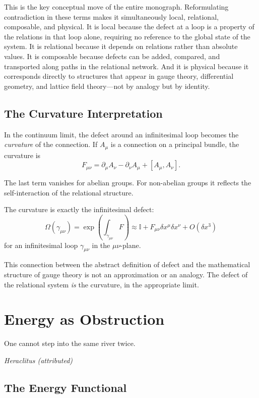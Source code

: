 \documentclass[12pt,a4paper,openany]{book}
\theoremstyle{plain}
\theoremstyle{definition}
\theoremstyle{remark}
\newcommand{\id}{\mathbb{I}}
\newcommand{\defect}{\Omega}
\newcommand{\del}{\partial}
\begin{document}
This is the key conceptual move of the entire monograph. Reformulating contradiction in these terms makes it simultaneously local, relational, composable, and physical. It is local because the defect at a loop is a property of the relations in that loop alone, requiring no reference to the global state of the system. It is relational because it depends on relations rather than absolute values. It is composable because defects can be added, compared, and transported along paths in the relational network. And it is physical because it corresponds directly to structures that appear in gauge theory, differential geometry, and lattice field theory---not by analogy but by identity.

\section{The Curvature Interpretation}

In the continuum limit, the defect around an infinitesimal loop becomes the \emph{curvature} of the connection. If $A_\mu$ is a connection on a principal bundle, the curvature is
\[
F_{\mu\nu} = \del_\mu A_\nu - \del_\nu A_\mu + [A_\mu, A_\nu].
\]

The last term vanishes for abelian groups. For non-abelian groups it reflects the self-interaction of the relational structure.

The curvature is exactly the infinitesimal defect:
\[
\defect(\gamma_{\mu\nu}) = \exp\!\left(\int_{\gamma_{\mu\nu}} F\right) \approx \id + F_{\mu\nu} \delta x^\mu \delta x^\nu + O(\delta x^3)
\]
for an infinitesimal loop $\gamma_{\mu\nu}$ in the $\mu\nu$-plane.

This connection between the abstract definition of defect and the mathematical structure of gauge theory is not an approximation or an analogy. The defect of the relational system \emph{is} the curvature, in the appropriate limit.

\chapter{Energy as Obstruction}

\epigraph{%
  One cannot step into the same river twice.
}{%
  \textit{Heraclitus (attributed)}}

\section{The Energy Functional}
\end{document}
